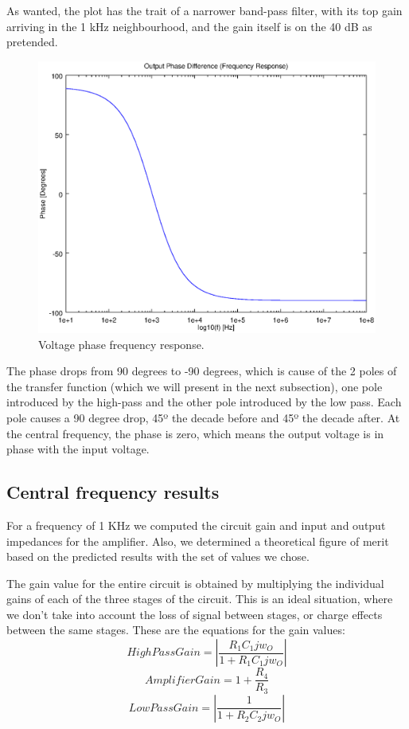As wanted, the plot has the trait of a narrower band-pass filter, with its top gain arriving in the 1 kHz neighbourhood, and the gain itself is on the 40 dB as pretended.

\begin{figure}[h!] \centering
\includegraphics[width=0.6\linewidth]{phase.eps}
\caption{Voltage phase frequency response.}
\label{fig:gainfreq}
\end{figure}

The phase drops from 90 degrees to -90 degrees, which is cause of the 2 poles of the transfer function (which we will present in the next subsection), one pole introduced by the high-pass and the 
other pole introduced by the low pass. Each pole causes a 90 degree drop, 45º the decade before and 45º the decade after. At the central frequency, the phase is zero, which means the output 
voltage is in phase with the input voltage.

\subsection{Central frequency results}
For a frequency of 1 KHz we computed the circuit gain and input and output impedances for the amplifier. Also, we determined a theoretical figure of merit based on the predicted results with the set 
of values we chose.

The gain value for the entire circuit is obtained by multiplying the individual gains of each of the three stages of the circuit. This is an ideal situation, where we don't take into account the loss of signal between stages, or charge effects between the same stages.
These are the equations for the gain values:
\begin{equation}
High Pass Gain=|\frac{R_{1}C_{1}jw_{O}}{1+R_{1}C_{1}jw_{O}}|
\end{equation}
\begin{equation}
Amplifier Gain=1+\frac{R_{4}}{R_{3}}
\end{equation}
\begin{equation}
Low Pass Gain=|\frac{1}{1+R_{2}C_{2}jw_{O}}|
\end{equation}

